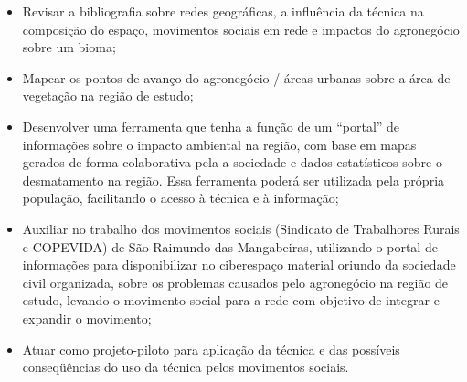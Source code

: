 \begin{itemize}
 \item Revisar a bibliografia sobre redes geográficas, a influência da técnica na composição do espaço, movimentos sociais em rede e impactos do agronegócio sobre um bioma;

 \item Mapear os pontos de avanço do agronegócio / áreas urbanas sobre a área de vegetação na região de estudo;

 \item Desenvolver uma ferramenta que tenha a função de um “portal” de informações sobre o impacto ambiental na região, com base em mapas gerados de forma colaborativa pela a sociedade e dados estatísticos sobre o desmatamento na região. Essa ferramenta poderá ser utilizada pela própria população, facilitando o acesso à técnica e à informação;

 \item Auxiliar no trabalho dos movimentos sociais (Sindicato de Trabalhores Rurais e COPEVIDA) de São Raimundo das Mangabeiras, utilizando o portal de informações para disponibilizar no ciberespaço material oriundo da sociedade civil organizada, sobre os problemas causados pelo agronegócio na região de estudo, levando o movimento social para a rede com objetivo de integrar e expandir o movimento;

\item Atuar como projeto-piloto para aplicação da técnica e das possíveis conseqüências do uso da técnica pelos movimentos sociais.
\end{itemize}




